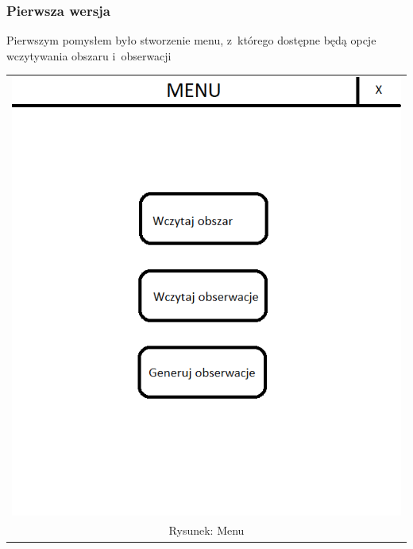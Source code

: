 \documentclass{article}
\begin{document}
\subsubsection{Pierwsza wersja}
Pierwszym pomysłem było stworzenie menu, z~którego dostępne będą opcje wczytywania obszaru i~obserwacji
\begin{center}
\begin{tabular}{c}
\includegraphics[scale = 1]{"menu0.png"}
\\Rysunek: Menu
\end{tabular}
\end{center}
\newpage
\end{document}
